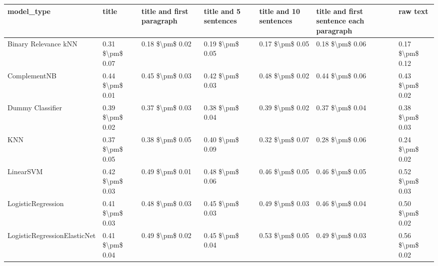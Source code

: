 \begin{tabular}{lllllll}
\toprule
                     model\_type &           title & title and first paragraph & title and 5 sentences & title and 10 sentences & title and first sentence each paragraph &            raw text \\
\midrule
           Binary Relevance kNN & 0.31 \$\textbackslash pm\$ 0.07 &           0.18 \$\textbackslash pm\$ 0.02 &       0.19 \$\textbackslash pm\$ 0.05 &        0.17 \$\textbackslash pm\$ 0.05 &                         0.18 \$\textbackslash pm\$ 0.06 &     0.17 \$\textbackslash pm\$ 0.12 \\
                   ComplementNB & 0.44 \$\textbackslash pm\$ 0.01 &           0.45 \$\textbackslash pm\$ 0.03 &       0.42 \$\textbackslash pm\$ 0.03 &        0.48 \$\textbackslash pm\$ 0.02 &                         0.44 \$\textbackslash pm\$ 0.06 &     0.43 \$\textbackslash pm\$ 0.02 \\
               Dummy Classifier & 0.39 \$\textbackslash pm\$ 0.02 &           0.37 \$\textbackslash pm\$ 0.03 &       0.38 \$\textbackslash pm\$ 0.04 &        0.39 \$\textbackslash pm\$ 0.02 &                         0.37 \$\textbackslash pm\$ 0.04 &     0.38 \$\textbackslash pm\$ 0.03 \\
                            KNN & 0.37 \$\textbackslash pm\$ 0.05 &           0.38 \$\textbackslash pm\$ 0.05 &       0.40 \$\textbackslash pm\$ 0.09 &        0.32 \$\textbackslash pm\$ 0.07 &                         0.28 \$\textbackslash pm\$ 0.06 &     0.24 \$\textbackslash pm\$ 0.02 \\
                      LinearSVM & 0.42 \$\textbackslash pm\$ 0.03 &           0.49 \$\textbackslash pm\$ 0.01 &       0.48 \$\textbackslash pm\$ 0.06 &        0.46 \$\textbackslash pm\$ 0.05 &                         0.46 \$\textbackslash pm\$ 0.05 &     0.52 \$\textbackslash pm\$ 0.03 \\
             LogisticRegression & 0.41 \$\textbackslash pm\$ 0.03 &           0.48 \$\textbackslash pm\$ 0.03 &       0.45 \$\textbackslash pm\$ 0.03 &        0.49 \$\textbackslash pm\$ 0.03 &                         0.46 \$\textbackslash pm\$ 0.04 &     0.50 \$\textbackslash pm\$ 0.02 \\
   LogisticRegressionElasticNet & 0.41 \$\textbackslash pm\$ 0.04 &           0.49 \$\textbackslash pm\$ 0.02 &       0.45 \$\textbackslash pm\$ 0.04 &        0.53 \$\textbackslash pm\$ 0.05 &                         0.49 \$\textbackslash pm\$ 0.03 &     0.56 \$\textbackslash pm\$ 0.02 \\

\end{tabular}
